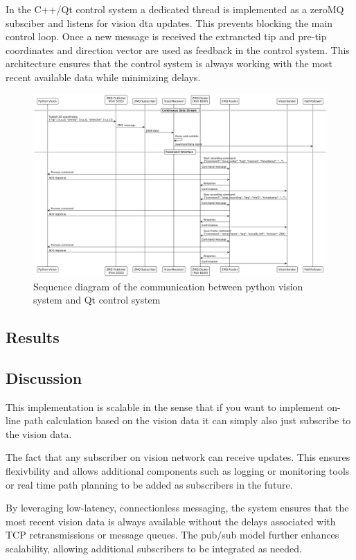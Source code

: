 In the C++/Qt control system a dedicated thread is implemented as a zeroMQ subsciber and listens for vision dta updates. This prevents blocking the main control loop. Once a new message is received the extrancted tip and pre-tip coordinates and direction vector are used as feedback in the control system. This architecture ensures that the control system is always working with the most recent available data while minimizing delays.

\begin{figure} [H]
    \centering
    \includegraphics[width=1.1\linewidth]{images/Software documentation/visionSequencediag.png}
    \caption{Sequence diagram of the communication between python vision system and Qt control system}
    \label{fig:seqComm}
\end{figure}

\subsection{Results}

\subsection{Discussion}
This implementation is scalable in the sense that if you want to implement on-line path calculation based on the vision data it can simply also just subscribe to the vision data.

The fact that any subscriber on vision network can receive updates. This ensures flexivbility and allows additional components such as logging or monitoring tools or real time path planning to be added as subscribers in the future.

By leveraging low-latency, connectionless messaging, the system ensures that the most recent vision data is always available without the delays associated with TCP retransmissions or message queues. The pub/sub model further enhances scalability, allowing additional subscribers to be integrated as needed.

